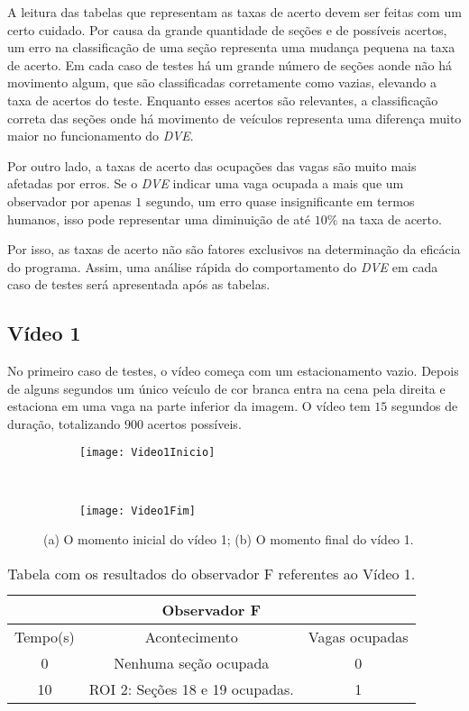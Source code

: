 A leitura das tabelas que representam as taxas de acerto devem ser feitas com um certo cuidado. Por causa da grande quantidade de seções e de possíveis acertos, um erro na classificação de uma seção representa uma mudança pequena na taxa de acerto. Em cada caso de testes há um grande número de seções aonde não há movimento algum, que são classificadas corretamente como vazias, elevando a taxa de acertos do teste. Enquanto esses acertos são relevantes, a classificação correta das seções onde há movimento de veículos representa uma diferença muito maior no funcionamento do \textit{DVE}.

Por outro lado, a taxas de acerto das ocupações das vagas são muito mais afetadas por erros. Se o \textit{DVE} indicar uma vaga ocupada a mais que um observador por apenas $1$ segundo, um erro quase insignificante em termos humanos, isso pode representar uma diminuição de até $10\%$ na taxa de acerto. 

Por isso, as taxas de acerto não são fatores exclusivos na determinação da eficácia do programa. Assim, uma análise rápida do comportamento do \textit{DVE} em cada caso de testes será apresentada após as tabelas.

\subsection{Vídeo 1}

No primeiro caso de testes, o vídeo começa com um estacionamento vazio. Depois de alguns segundos um único veículo de cor branca entra na cena pela direita e estaciona em uma vaga na parte inferior da imagem. O vídeo tem $15$ segundos de duração, totalizando $900$ acertos possíveis.

\begin{figure}[H]
\centering
\begin{subfigure}{.5\textwidth}
\centering
\texttt{[image: Video1Inicio]}
\caption{}
\end{subfigure}\
\begin{subfigure}{.5\textwidth}
\centering
\texttt{[image: Video1Fim]}
\caption{}
\end{subfigure}
\centering
\caption{(a) O momento inicial do vídeo 1; (b) O momento final do vídeo 1.}%
\label{}%
\end{figure}

\begin{table}[H]
\begin{center}
\begin{tabular}{|c||c||c|}
\hline
\multicolumn{3}{|c|}{Observador F}  \\ \hline \hline
Tempo(s) & Acontecimento & Vagas ocupadas\\ \hline
0 & Nenhuma seção ocupada & 0 \\ \hline
10 & ROI 2: Seções 18 e 19 ocupadas. & 1 \\
\hline
\end{tabular}
\caption{Tabela com os resultados do observador F referentes ao Vídeo 1.}
\label{tab:video1F}
\end{center}
\end{table}

